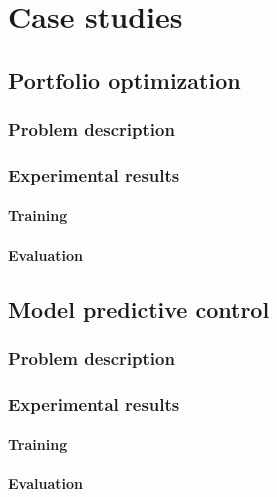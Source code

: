 \documentclass[
]{article}
\let\oldparagraph\paragraph
\renewcommand{\paragraph}[1]{\oldparagraph{#1}\mbox{}}
\begin{document}
\section{Case studies}\label{case-studies}

\subsection{Portfolio optimization}\label{portfolio-optimization}

\subsubsection{Problem description}\label{problem-description}

\subsubsection{Experimental results}\label{experimental-results}

\paragraph{Training}\label{training}

\paragraph{Evaluation}\label{evaluation}

\subsection{Model predictive control}\label{model-predictive-control}

\subsubsection{Problem description}\label{problem-description-1}

\subsubsection{Experimental results}\label{experimental-results-1}

\paragraph{Training}\label{training-1}

\paragraph{Evaluation}\label{evaluation-1}
\end{document}
